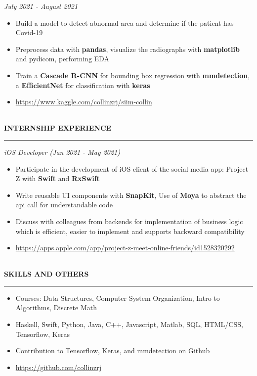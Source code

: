 \documentclass{article}
\begin{document}
\emph{July 2021 - August 2021}
\begin{itemize}[leftmargin=*,topsep=0pt]
\item Build a model to detect abnormal area and determine if the patient has Covid-19
\item Preprocess data with \textbf{pandas}, visualize the radiographs with \textbf{matplotlib} and pydicom, performing EDA
\item Train a \textbf{Cascade R-CNN} for bounding box regression with \textbf{mmdetection}, a \textbf{EfficientNet} for classification with \textbf{keras}
\item \url{https://www.kaggle.com/collinzrj/siim-collin}

\end{itemize} \ \\ 
\noindent
{\textbf{INTERNSHIP EXPERIENCE}}\newline
\rule{\textwidth}{1pt}\newline
\emph{iOS Developer (Jan 2021 - May 2021)}
\begin{itemize}[leftmargin=*,topsep=0pt]
\item Participate in the development of iOS client of the social media app: Project Z with \textbf{Swift} and \textbf{RxSwift}
\item Write reusable UI components with \textbf{SnapKit}, Use of \textbf{Moya} to abstract the api call for understandable code
\item Discuss with colleagues from backends for implementation of business logic which is efficient, easier to implement and supports backward compatibility
\item \url{https://apps.apple.com/app/project-z-meet-online-friends/id1528320292}

\end{itemize} \ \\ 
\noindent
{\textbf{SKILLS AND OTHERS}}\newline
\rule{\textwidth}{1pt}\begin{itemize}[leftmargin=*,topsep=0pt]
\item Courses: Data Structures, Computer System Organization, Intro to Algorithms, Discrete Math
\item Haskell, Swift, Python, Java, C++, Javascript, Matlab, SQL, HTML/CSS, Tensorflow, Keras
\item Contribution to Tensorflow, Keras, and mmdetection on Github
\item \url{https://github.com/collinzrj}

\end{itemize} \ \\ 
\end{document}
